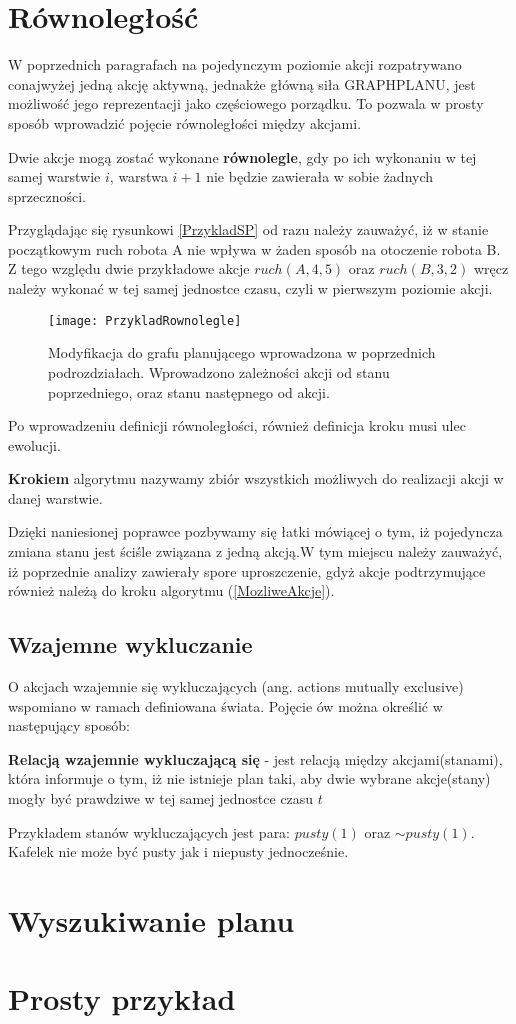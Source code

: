     \section{Równoległość}
    W poprzednich paragrafach na pojedynczym poziomie akcji rozpatrywano conajwyżej jedną akcję aktywną, jednakże główną siła GRAPHPLANU, jest 
    możliwość jego reprezentacji jako częściowego porządku. To pozwala w prosty sposób wprowadzić pojęcie równoległości między akcjami. 
    \begin{definition}
        \label{Warstwa}
        Dwie akcje mogą zostać wykonane \textbf{równolegle}, gdy po ich wykonaniu w tej samej warstwie $i$, warstwa $i+1$ nie będzie 
        zawierała w sobie żadnych sprzeczności.
    \end{definition}
    Przyglądając się rysunkowi \ref{PrzykladSP} od razu należy zauważyć, iż w stanie początkowym ruch robota A nie wpływa w żaden sposób na otoczenie
    robota B. Z tego względu dwie przykładowe akcje $ruch(A,4,5)$ oraz $ruch(B,3,2)$ wręcz należy wykonać w tej samej jednostce czasu, czyli w pierwszym
    poziomie akcji. 
    \begin{figure}[H]
        \texttt{[image: PrzykladRownolegle]}
        \centering
        \caption{Modyfikacja do grafu planującego wprowadzona w poprzednich podrozdziałach. Wprowadzono zależności akcji od stanu poprzedniego, oraz stanu 
        następnego od akcji.}
        \label{PlanningGraphLevels}
    \end{figure}
    
    Po wprowadzeniu definicji równoległości, również definicja kroku musi ulec ewolucji. 
    \begin{definition}
        \label{Krok}
        \textbf{Krokiem} algorytmu nazywamy zbiór wszystkich możliwych do realizacji akcji w danej warstwie.
    \end{definition}
    Dzięki naniesionej poprawce pozbywamy się łatki mówiącej o tym, iż pojedyncza zmiana stanu jest ściśle związana z jedną akcją.W tym miejscu należy 
    zauważyć, iż poprzednie analizy zawierały spore uproszczenie, gdyż akcje podtrzymujące również należą do kroku algorytmu (\ref{MozliweAkcje}).

    \subsection{Wzajemne wykluczanie}
    O akcjach wzajemnie się wykluczających (ang. actions mutually exclusive) wspomiano w ramach definiowana świata. Pojęcie ów można 
    określić w następujący sposób:
    \begin{definition}
        \label{Warstwa}
        \textbf{Relacją wzajemnie wykluczającą się} - jest relacją między akcjami(stanami), która informuje o tym, iż nie istnieje plan taki,
        aby dwie wybrane akcje(stany) mogły być prawdziwe w tej samej jednostce czasu $t$
    \end{definition}
    Przykładem stanów wykluczających jest para: $pusty(1)$ oraz $\sim pusty(1)$. Kafelek nie może być pusty jak i niepusty jednocześnie.

\section{Wyszukiwanie planu}

\section{Prosty przykład}
